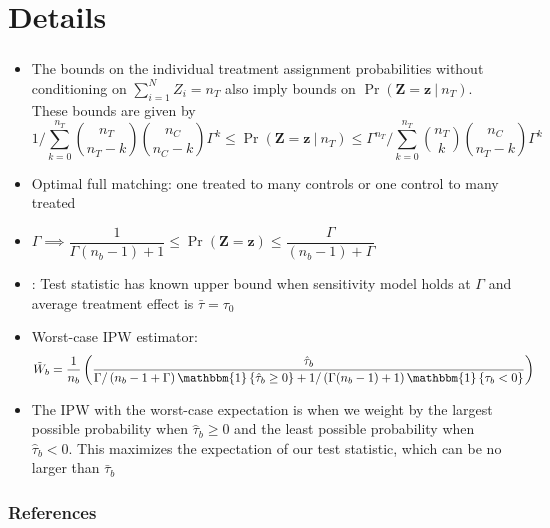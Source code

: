 \documentclass[table, xcolor = {dvipsnames}, 9pt]{beamer}
\newcommand\given[1][]{\:#1\vert\:}
\theoremstyle{plain}
\begin{document}
\section{Details}
\begin{frame}[t]
\frametitle{} 
\vfill
\begin{itemize}
\item The bounds on the individual treatment assignment probabilities without conditioning on $\sum_{i = 1}^N Z_i = n_T$ also imply bounds on $\Pr\left(\bm{Z} = \bm{z} \given n_T\right)$. These bounds are given by
\begin{equation}
1 \bigg / \sum \limits_{k = 0}^{n_T} \binom{n_T}{n_T - k} \binom{n_C}{n_C - k} \Gamma^k \leq \Pr\left(\bm{Z} = \bm{z} \given n_T\right) \leq \Gamma^{n_T} \bigg/ \sum \limits_{k = 0}^{n_T} \binom{n_T}{k} \binom{n_C}{n_T - k} \Gamma^k
\end{equation}
\item Optimal full matching: one treated to many controls or one control to many treated
\item $\Gamma \implies \dfrac{1}{\Gamma(n_b - 1) + 1} \leq \Pr(\bm{Z} = \bm{z}) \leq \dfrac{\Gamma}{(n_b - 1) + \Gamma}$
\item \citet[][Theorem 2]{fogarty2020}: Test statistic has known upper bound when sensitivity model holds at $\Gamma$ and average treatment effect is $\bar{\tau} = \tau_0$
\item Worst-case IPW estimator:
\begin{equation}
\tilde{W}_b = \dfrac{1}{n_b}\left(\dfrac{\hat{\tau}_b}{\Gamma / \left(n_b - 1 + \Gamma\right) \mathbbm{1}\left\{\hat{\tau}_b \geq 0\right\} + 1 / \left(\Gamma(n_b - 1) + 1\right)\mathbbm{1}\left\{\tau_b < 0\right\}}\right)
\end{equation}
\item The IPW with the worst-case expectation is when we weight by the largest possible probability when $\hat{\tau}_b \geq 0$ and the least possible probability when $\hat{\tau}_b < 0$. This maximizes the expectation of our test statistic, which can be no larger than $\bar{\tau}_b$
\end{itemize}  
\vfill
\end{frame}

\begin{frame}[allowframebreaks]
\frametitle{References} 
\scriptsize

\end{frame}
\end{document}

